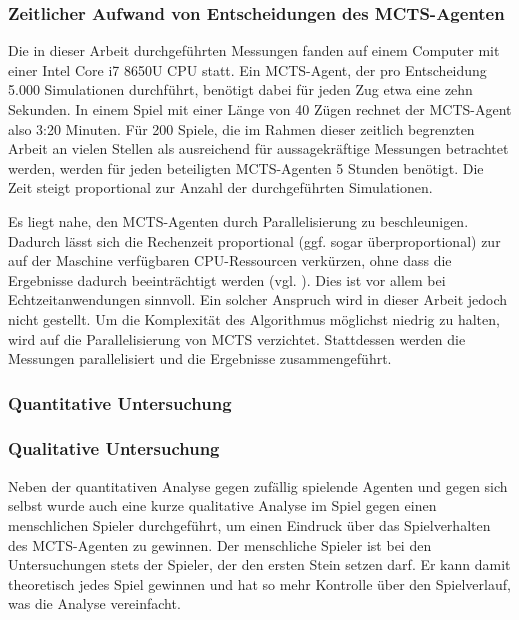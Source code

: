 \subsubsection{Zeitlicher Aufwand von Entscheidungen des MCTS-Agenten}

Die in dieser Arbeit durchgeführten Messungen fanden auf einem Computer mit einer Intel Core i7 8650U CPU statt. Ein MCTS-Agent, der pro Entscheidung 5.000 Simulationen durchführt, benötigt dabei für jeden Zug etwa eine zehn Sekunden. In einem Spiel mit einer Länge von 40 Zügen rechnet der MCTS-Agent also 3:20 Minuten. Für 200 Spiele, die im Rahmen dieser zeitlich begrenzten Arbeit an vielen Stellen als ausreichend für aussagekräftige Messungen betrachtet werden, werden für jeden beteiligten MCTS-Agenten 5 Stunden benötigt. Die Zeit steigt proportional zur Anzahl der durchgeführten Simulationen.

Es liegt nahe, den MCTS-Agenten durch Parallelisierung zu beschleunigen. Dadurch lässt sich die Rechenzeit proportional (ggf. sogar überproportional) zur auf der Maschine verfügbaren CPU-Ressourcen verkürzen, ohne dass die Ergebnisse dadurch beeinträchtigt werden (vgl. \cite{Chaslot.2008}). Dies ist vor allem bei Echtzeitanwendungen sinnvoll. Ein solcher Anspruch wird in dieser Arbeit jedoch nicht gestellt. Um die Komplexität des Algorithmus möglichst niedrig zu halten, wird auf die Parallelisierung von MCTS verzichtet. Stattdessen werden die Messungen parallelisiert und die Ergebnisse zusammengeführt.

\subsubsection{Quantitative Untersuchung}


\subsubsection{Qualitative Untersuchung}

Neben der quantitativen Analyse gegen zufällig spielende Agenten und gegen sich selbst wurde auch eine kurze qualitative Analyse im Spiel gegen einen menschlichen Spieler durchgeführt, um einen Eindruck über das Spielverhalten des MCTS-Agenten zu gewinnen. Der menschliche Spieler ist bei den Untersuchungen stets der Spieler, der den ersten Stein setzen darf. Er kann damit theoretisch jedes Spiel gewinnen und hat so mehr Kontrolle über den Spielverlauf, was die Analyse vereinfacht.

